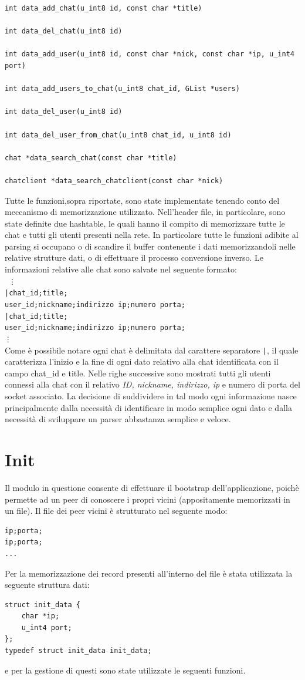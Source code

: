 \begin{lstlisting}
int data_add_chat(u_int8 id, const char *title)

int data_del_chat(u_int8 id)

int data_add_user(u_int8 id, const char *nick, const char *ip, u_int4 port)

int data_add_users_to_chat(u_int8 chat_id, GList *users)

int data_del_user(u_int8 id)

int data_del_user_from_chat(u_int8 chat_id, u_int8 id)

chat *data_search_chat(const char *title)

chatclient *data_search_chatclient(const char *nick)
\end{lstlisting}
Tutte le funzioni,sopra riportate, sono state implementate tenendo conto del meccanismo di memorizzazione utilizzato. Nell'header file, in particolare, sono state definite due hashtable, le quali hanno il compito di memorizzare tutte le chat e tutti gli utenti presenti nella rete. In particolare tutte le funzioni adibite al parsing si occupano o di scandire il buffer contenente i dati memorizzandoli nelle relative strutture dati, o di effettuare il processo conversione inverso. Le informazioni relative alle chat sono salvate nel seguente formato:\\
\texttt{
\vdots\\
		|chat\_id;title;\\
		user\_id;nickname;indirizzo ip;numero porta;\\
		|chat\_id;title;\\
		user\_id;nickname;indirizzo ip;numero porta;\\
\vdots\\
}
Come è possibile notare ogni chat è delimitata dal carattere separatore \texttt{|}, il quale caratterizza l'inizio e la fine di ogni dato relativo alla chat identificata con il campo chat\_id e title. Nelle righe successive sono mostrati tutti gli utenti connessi alla chat con il relativo \textit{ID, nickname, indirizzo, ip} e numero di porta del socket associato.
La decisione di suddividere in tal modo ogni informazione nasce principalmente dalla necessità di identificare in modo semplice ogni dato e dalla necessità di sviluppare un parser abbastanza semplice e veloce.  

\section{Init}
Il modulo in questione consente di effettuare il bootstrap dell'applicazione, poichè permette ad un peer di conoscere i propri vicini (appositamente memorizzati in un file). Il file dei peer vicini è strutturato nel seguente modo:
\begin{lstlisting}
ip;porta;
ip;porta;
...
\end{lstlisting}
Per la memorizzazione dei record presenti all'interno del file è stata utilizzata la seguente struttura dati:
\begin{lstlisting}
struct init_data {
	char *ip;
	u_int4 port;
};
typedef struct init_data init_data;
\end{lstlisting}
e per la gestione di questi sono state utilizzate le seguenti funzioni.
